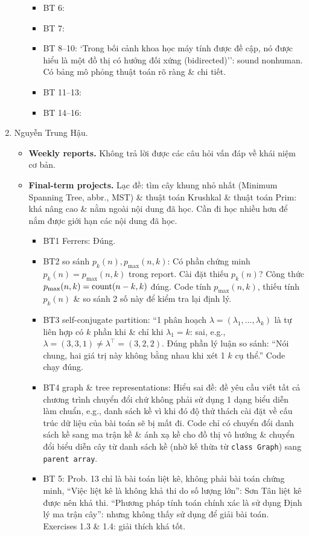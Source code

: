 \documentclass{article}
\begin{document}
\begin{enumerate}
\begin{itemize}
\begin{itemize}
            \item BT 6:
            \item BT 7:
            \item BT 8--10: `Trong bối cảnh khoa học máy tính được đề cập, nó được hiểu là một đồ thị có hướng đối xứng (bidirected)'': sound nonhuman. Có bảng mô phỏng thuật toán rõ ràng \& chi tiết.
            \item BT 11--13:
            \item BT 14--16:
        \end{itemize}
    \end{itemize}
    \item {\sc Nguyễn Trung Hậu.}
    \begin{itemize}
        \item {\bf Weekly reports.} Không trả lời được các câu hỏi vấn đáp về khái niệm cơ bản.
        \item {\bf Final-term projects.} Lạc đề: tìm cây khung nhỏ nhất (Minimum Spanning Tree, abbr.,  MST) \& thuật toán Krushkal \& thuật toán Prim: khá nâng cao \& nằm ngoài nội dung đã học. Cần đi học nhiều hơn để nắm được giới hạn các nội dung đã học.
        \begin{itemize}
            \item BT1 Ferrers: Đúng.
            \item BT2 so sánh $p_k(n),p_{\max}(n,k)$: Có phần chứng minh $p_k(n) = p_{\max}(n,k)$ trong report. Cài đặt thiếu $p_k(n)$? Công thức $p_{\max}(n,k) = {\rm count}(n - k,k)$ đúng. Code tính $p_{\max}(n,k)$, thiếu tính $p_k(n)$ \& so sánh 2 số này để kiểm tra lại định lý.
            \item BT3 self-conjugate partition: ``1 phân hoạch $\lambda = (\lambda_1,\ldots,\lambda_k)$ là tự liên hợp có $k$ phần khi \& chỉ khi $\lambda_1 = k$: sai, e.g., $\lambda = (3,3,1)\ne\lambda^\top = (3,2,2)$. Đúng phần lý luận so sánh: ``Nói chung, hai giá trị này không bằng nhau khi xét 1 $k$ cụ thể.'' Code chạy đúng.
            \item BT4 graph \& tree representations: Hiểu sai đề: đề yêu cầu viết tất cả chương trình chuyển đổi chứ không phải sử dụng 1 dạng biểu diễn làm chuẩn, e.g., danh sách kề vì khi đó độ thử thách cài đặt về cấu trúc dữ liệu của bài toán sẽ bị mất đi. Code chỉ có chuyển đổi danh sách kề sang ma trận kề \& ánh xạ kề cho đồ thị vô hướng \& chuyển đổi biểu diễn cây từ danh sách kề (nhờ kế thừa từ {\tt class Graph}) sang {\tt parent array}.
            \item BT 5: Prob. 13 chỉ là bài toán liệt kê, không phải bài toán chứng minh, ``Việc liệt kê là không khả thi do số lượng lớn'': {\sc Sơn Tân} liệt kê được nên khả thi. ``Phương pháp tính toán chính xác là sử dụng Định lý ma trận cây'': nhưng không thấy sử dụng để giải bài toán. Exercises 1.3 \& 1.4: giải thích khá tốt.

\end{itemize}
\end{itemize}
\end{enumerate}
\end{document}
